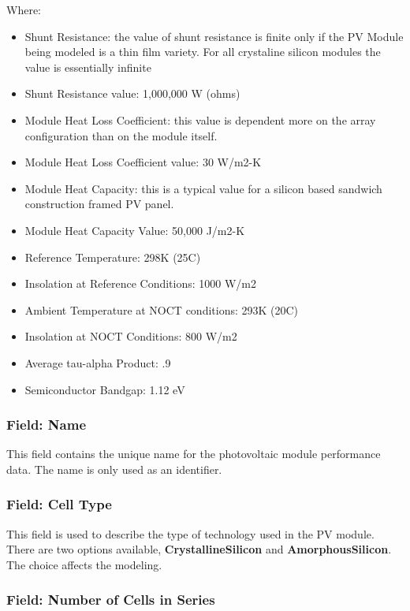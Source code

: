 Where:

\begin{itemize}
\item
  Shunt Resistance: the value of shunt resistance is finite only if the PV Module being modeled is a thin film variety. For all crystaline silicon modules the value is essentially infinite
\item
  Shunt Resistance value: 1,000,000 W (ohms)
\item
  Module Heat Loss Coefficient: this value is dependent more on the array configuration than on the module itself.
\item
  Module Heat Loss Coefficient value: 30 W/m2-K
\item
  Module Heat Capacity: this is a typical value for a silicon based sandwich construction framed PV panel.
\item
  Module Heat Capacity Value: 50,000 J/m2-K
\item
  Reference Temperature: 298K (25C)
\item
  Insolation at Reference Conditions: 1000 W/m2
\item
  Ambient Temperature at NOCT conditions: 293K (20C)
\item
  Insolation at NOCT Conditions: 800 W/m2
\item
  Average tau-alpha Product: .9
\item
  Semiconductor Bandgap: 1.12 eV
\end{itemize}

\subsubsection{Field: Name}\label{field-name-25}

This field contains the unique name for the photovoltaic module performance data. The name is only used as an identifier.

\subsubsection{Field: Cell Type}\label{field-cell-type}

This field is used to describe the type of technology used in the PV module. There are two options available, \textbf{CrystallineSilicon} and \textbf{AmorphousSilicon}. The choice affects the modeling.

\subsubsection{Field: Number of Cells in Series}\label{field-number-of-cells-in-series}


